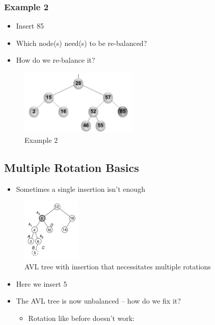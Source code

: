 \documentclass[
  10pt,
  english,
  letterpaper,
,tablecaptionabove
]{scrartcl}
\providecommand{\tightlist}{%
  \setlength{\itemsep}{0pt}\setlength{\parskip}{0pt}}
\begin{document}
\hypertarget{example-2}{%
\subsubsection{Example 2}\label{example-2}}

\begin{itemize}
\tightlist
\item
  Insert 85
\item
  Which node(s) need(s) to be re-balanced?
\item
  How do we re-balance it?
\end{itemize}

\begin{figure}
\centering
\includegraphics[width=0.5\textwidth,height=\textheight]{images/8.png}
\caption{Example 2}
\end{figure}

\hypertarget{multiple-rotation-basics}{%
\subsection{Multiple Rotation Basics}\label{multiple-rotation-basics}}

\begin{itemize}
\tightlist
\item
  Sometimes a single insertion isn't enough
\end{itemize}

\begin{figure}
\centering
\includegraphics[width=0.25\textwidth,height=\textheight]{images/9.png}
\caption{AVL tree with insertion that necessitates multiple rotations}
\end{figure}

\begin{itemize}
\tightlist
\item
  Here we insert 5
\item
  The AVL tree is now unbalanced -- how do we fix it?

  \begin{itemize}
  \tightlist
  \item
    Rotation like before doesn't work:
  \end{itemize}
\end{itemize}
\end{document}
